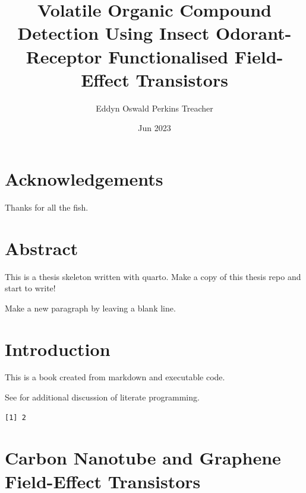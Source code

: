 \documentclass[
  a4paper,
]{scrbook}
\title{Volatile Organic Compound Detection Using Insect Odorant-Receptor
Functionalised Field-Effect Transistors}
\author{Eddyn Oswald Perkins Treacher}
\date{Jun 2023}
\begin{document}
\frontmatter
\maketitle
\ifdefined\Shaded\renewenvironment{Shaded}{\begin{tcolorbox}[breakable, enhanced, borderline west={3pt}{0pt}{shadecolor}, frame hidden, interior hidden, boxrule=0pt, sharp corners]}{\end{tcolorbox}}\fi

\mainmatter
{}

\hypertarget{acknowledgements}{%
\chapter*{Acknowledgements}\label{acknowledgements}}


Thanks for all the fish.


\hypertarget{abstract}{%
\chapter*{Abstract}\label{abstract}}


This is a thesis skeleton written with quarto. Make a copy of this
thesis repo and start to write!

Make a new paragraph by leaving a blank line.

\newpage
\tableofcontents


\hypertarget{introduction}{%
\chapter{Introduction}\label{introduction}}

This is a book created from markdown and executable code.

See for additional discussion of literate programming.

\begin{verbatim}
[1] 2
\end{verbatim}


\hypertarget{carbon-nanotube-and-graphene-field-effect-transistors}{%
\chapter{Carbon Nanotube and Graphene Field-Effect
Transistors}\label{carbon-nanotube-and-graphene-field-effect-transistors}}
\end{document}
